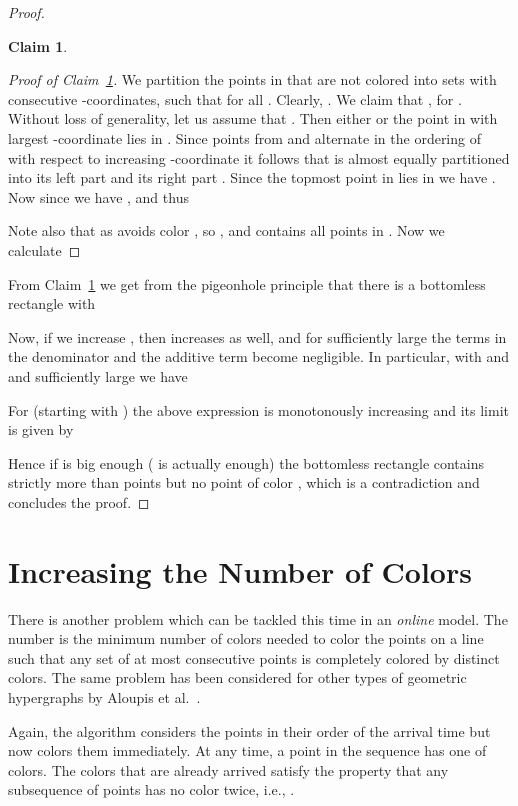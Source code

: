 \documentclass[11pt,a4paper]{amsart}
\theoremstyle{plain}
\newtheorem{claim}[theorem]{Claim}
\theoremstyle{definition}
\begin{document}
\begin{proof}
\begin{claim}\label{claim:3-halves}
 
\end{claim}
\begin{proof}[Proof of Claim~\ref{claim:3-halves}]
 We partition the points in  that are not colored  into  sets  with consecutive -coordinates, 
 such that  for all .
 Clearly, .
 We claim that , for .
 Without loss of generality, let us assume that .
 Then either  or the point in  with largest -coordinate lies in .
 Since points from  and  alternate in the ordering of  with respect to increasing -coordinate it follows that  is almost equally 
partitioned into its left part  and its right part .
 Since the topmost point in  lies in  we have .
 Now since  we have , and thus
 
Note also that  as  avoids color , so , and contains all  points in .
Now we calculate

\end{proof}

From Claim~\ref{claim:3-halves} we get from the pigeonhole principle that there is a bottomless rectangle  with

Now, if we increase , then  increases as well, and for sufficiently large  the terms  in the denominator and the additive term  become negligible.
In particular, with  and  and sufficiently large  we have

For  (starting with ) the above expression is monotonously increasing and its limit is given by

Hence if  is big enough ( is actually enough) the bottomless rectangle  contains strictly more than  points but no point of color , which is a contradiction and concludes the proof.
\end{proof}

\section{Increasing the Number of Colors}
\label{sec:ck}

There is another problem which can be tackled this time in an {\em online} model. The number  is the minimum number of colors needed to color the points on a line such that any set of at most  consecutive points is completely colored by distinct colors. The same problem has been considered for other types of geometric hypergraphs by Aloupis et al.~\cite{ACCLS09}. 

Again, the algorithm considers the points in their order of the arrival time  but now colors them immediately. At any time, a point in the sequence has one of  colors. The colors that are already arrived satisfy the property that any subsequence of  points has no color twice, i.e.,  . 
\end{document}
